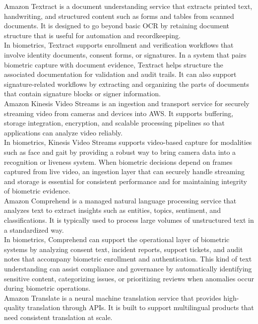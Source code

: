 \documentclass[11pt]{article}
\begin{document}
Amazon Textract is a document understanding service that extracts printed text, handwriting, and structured content such as forms and tables from scanned documents. It is designed to go beyond basic OCR by retaining document structure that is useful for automation and recordkeeping. \\

In biometrics, Textract supports enrollment and verification workflows that involve identity documents, consent forms, or signatures. In a system that pairs biometric capture with document evidence, Textract helps structure the associated documentation for validation and audit trails. It can also support signature-related workflows by extracting and organizing the parts of documents that contain signature blocks or signer information. \\

Amazon Kinesis Video Streams is an ingestion and transport service for securely streaming video from cameras and devices into AWS. It supports buffering, storage integration, encryption, and scalable processing pipelines so that applications can analyze video reliably. \\

In biometrics, Kinesis Video Streams supports video-based capture for modalities such as face and gait by providing a robust way to bring camera data into a recognition or liveness system. When biometric decisions depend on frames captured from live video, an ingestion layer that can securely handle streaming and storage is essential for consistent performance and for maintaining integrity of biometric evidence. \\

Amazon Comprehend is a managed natural language processing service that analyzes text to extract insights such as entities, topics, sentiment, and classifications. It is typically used to process large volumes of unstructured text in a standardized way. \\

In biometrics, Comprehend can support the operational layer of biometric systems by analyzing consent text, incident reports, support tickets, and audit notes that accompany biometric enrollment and authentication. This kind of text understanding can assist compliance and governance by automatically identifying sensitive content, categorizing issues, or prioritizing reviews when anomalies occur during biometric operations. \\

Amazon Translate is a neural machine translation service that provides high-quality translation through APIs. It is built to support multilingual products that need consistent translation at scale. \\
\end{document}
